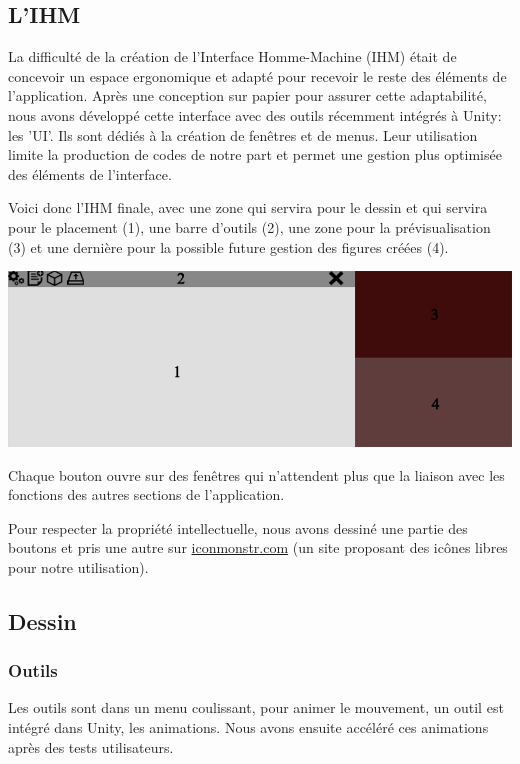 \documentclass[a4paper,11pt]{article}
\begin{document}
		\subsection{L'IHM}
			La difficulté de la création de l'Interface Homme-Machine (IHM) était de concevoir un espace ergonomique et adapté pour recevoir le reste des éléments de l'application. Après une conception sur papier pour assurer cette adaptabilité, nous avons développé cette interface avec des outils récemment intégrés à Unity: les 'UI'. Ils sont dédiés à la création de fenêtres et de menus. Leur utilisation limite la production de codes de notre part et permet une gestion plus optimisée des éléments de l'interface.
			
			Voici donc l'IHM finale, avec une zone qui servira pour le dessin et qui servira pour le placement (1), une barre d'outils (2), une zone pour la prévisualisation (3) et une dernière pour la possible future gestion des figures créées (4).
			
			\centerline{\includegraphics[scale=0.5]{images/ihm.png}}

			Chaque bouton ouvre sur des fenêtres qui n'attendent plus que la liaison avec les fonctions des autres sections de l'application.
			
			Pour respecter la propriété intellectuelle, nous avons dessiné une partie des boutons et pris une autre sur \href{http://www.iconmonstr.com}{iconmonstr.com} (un site proposant des icônes libres pour notre utilisation).
		\subsection{Dessin}
		
			\subsubsection{Outils}	
						
				Les outils sont dans un menu coulissant, pour animer le mouvement, un outil est intégré dans Unity, les animations. Nous avons ensuite accéléré ces animations après des tests utilisateurs.
					
\end{document}
